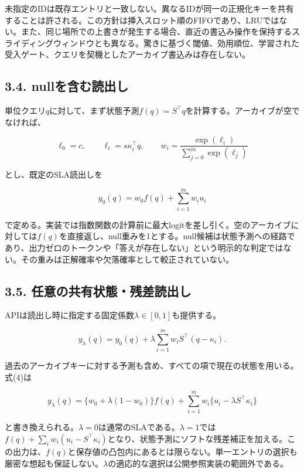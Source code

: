 \documentclass[11pt,a4paper]{article}
\begin{document}
未指定のIDは既存エントリと一致しない。異なるIDが同一の正規化キーを共有することは許される。この方針は挿入スロット順のFIFOであり、LRUではない。また、同じ場所での上書きが発生する場合、直近の書込み操作を保持するスライディングウィンドウとも異なる。驚きに基づく閾値、効用順位、学習された受入ゲート、クエリを契機としたアーカイブ書込みは存在しない。

\subsection{3.4. nullを含む読出し}\label{nullux3092ux542bux3080ux8aadux51faux3057}

単位クエリ\(q\)に対して、まず状態予測\(f(q)=S^{\top}q\)を計算する。アーカイブが空でなければ、

\nopagebreak[4]

\[
\ell_0=c,\qquad \ell_i=s\kappa_i^{\top}q,\qquad
w_i=\frac{\exp(\ell_i)}{\sum_{j=0}^{m}\exp(\ell_j)}
\tag{2}
\]

とし、既定のSLA読出しを

\nopagebreak[4]

\[
y_0(q)=w_0f(q)+\sum_{i=1}^{m}w_i u_i
\tag{3}
\]

で定める。実装では指数関数の計算前に最大logitを差し引く。空のアーカイブに対しては\(f(q)\)を直接返し、null重みを1とする。null候補は状態予測への経路であり、出力ゼロのトークンや「答えが存在しない」という明示的な判定ではない。その重みは正解確率や欠落確率として較正されていない。

\subsection{3.5. 任意の共有状態・残差読出し}\label{ux4efbux610fux306eux5171ux6709ux72b6ux614bux6b8bux5deeux8aadux51faux3057}

APIは読出し時に指定する固定係数\(\lambda\in[0,1]\)も提供する。

\nopagebreak[4]

\[
y_{\lambda}(q)=y_0(q)+\lambda\sum_{i=1}^{m}w_iS^{\top}(q-\kappa_i).
\tag{4}
\]

過去のアーカイブキーに対する予測も含め、すべての項で現在の状態を用いる。式(4)は

\nopagebreak[4]

\[
y_{\lambda}(q)=\{w_0+\lambda(1-w_0)\}f(q)
 +\sum_{i=1}^{m}w_i\{u_i-\lambda S^{\top}\kappa_i\}
\tag{5}
\]

と書き換えられる。\(\lambda=0\)は通常のSLAである。\(\lambda=1\)では\(f(q)+\sum_iw_i(u_i-S^{\top}\kappa_i)\)となり、状態予測にソフトな残差補正を加える。この出力は、\(f(q)\)と保存値の凸包内にあるとは限らない。単一エントリの選択も厳密な想起も保証しない。\(\lambda\)の適応的な選択は公開参照実装の範囲外である。
\end{document}
